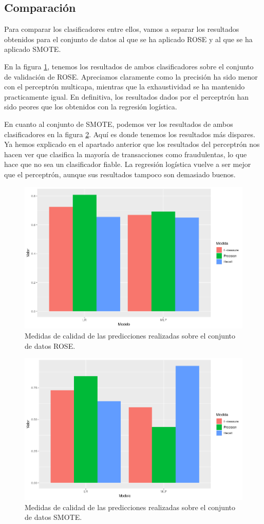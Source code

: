 \subsection{Comparación}
Para comparar los clasificadores entre ellos, vamos a separar los resultados
obtenidos para el conjunto de datos al que se ha aplicado ROSE y al que se ha
aplicado SMOTE.

En la figura \ref{fig:rose-barplot}, tenemos los resultados de ambos
clasificadores sobre el conjunto de validación de ROSE. Apreciamos claramente
como la precisión ha sido menor con el perceptrón multicapa, mientras que la
exhaustividad se ha mantenido practicamente igual. En definitiva, los resultados
dados por el perceptrón han sido peores que los obtenidos con la regresión
logística.

En cuanto al conjunto de SMOTE, podemos ver los resultados de ambos
clasificadores en la figura \ref{fig:smote-barplot}. Aquí es donde tenemos los
resultados más dispares. Ya hemos explicado en el apartado anterior que los
resultados del perceptrón nos hacen ver que clasifica la mayoría de
transacciones como fraudulentas, lo que hace que no sea un clasificador fiable.
La regresión logística vuelve a ser mejor que el perceptrón, aunque sus
resultados tampoco son demasiado buenos.

\begin{figure}
    \includegraphics[width=\textwidth]{images/classification/rose-barplot.png}
    \caption{Medidas de calidad de las predicciones realizadas sobre el conjunto de datos ROSE.}
    \label{fig:rose-barplot}
\end{figure}

\begin{figure}
    \includegraphics[width=\textwidth]{images/classification/smote-barplot.png}
    \caption{Medidas de calidad de las predicciones realizadas sobre el conjunto de datos SMOTE.}
    \label{fig:smote-barplot}
\end{figure}
